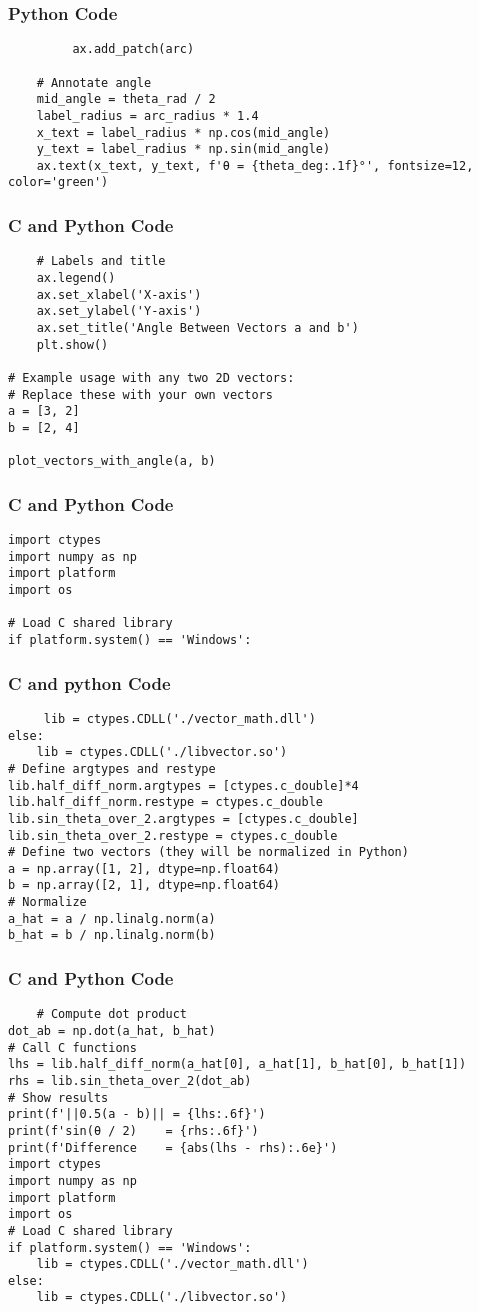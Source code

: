 \documentclass{beamer}
\begin{document}
\begin{frame}[fragile]
\frametitle{Python Code}
    \begin{lstlisting}
         ax.add_patch(arc)

    # Annotate angle
    mid_angle = theta_rad / 2
    label_radius = arc_radius * 1.4
    x_text = label_radius * np.cos(mid_angle)
    y_text = label_radius * np.sin(mid_angle)
    ax.text(x_text, y_text, f'θ = {theta_deg:.1f}°', fontsize=12, color='green')
    \end{lstlisting}
\end{frame}
\begin{frame}[fragile]
\frametitle{C and Python Code}
    \begin{lstlisting}    
    # Labels and title
    ax.legend()
    ax.set_xlabel('X-axis')
    ax.set_ylabel('Y-axis')
    ax.set_title('Angle Between Vectors a and b')
    plt.show()

# Example usage with any two 2D vectors:
# Replace these with your own vectors
a = [3, 2]
b = [2, 4]

plot_vectors_with_angle(a, b)

    \end{lstlisting}
\end{frame}
\begin{frame}[fragile]
\frametitle{C and Python Code}
\begin{lstlisting}
import ctypes
import numpy as np
import platform
import os

# Load C shared library
if platform.system() == 'Windows':

\end{lstlisting} 
\end{frame}
\begin{frame}[fragile]
\frametitle{C and python Code}
\begin{lstlisting}
     lib = ctypes.CDLL('./vector_math.dll')
else:
    lib = ctypes.CDLL('./libvector.so')
# Define argtypes and restype
lib.half_diff_norm.argtypes = [ctypes.c_double]*4
lib.half_diff_norm.restype = ctypes.c_double
lib.sin_theta_over_2.argtypes = [ctypes.c_double]
lib.sin_theta_over_2.restype = ctypes.c_double
# Define two vectors (they will be normalized in Python)
a = np.array([1, 2], dtype=np.float64)
b = np.array([2, 1], dtype=np.float64)
# Normalize
a_hat = a / np.linalg.norm(a)
b_hat = b / np.linalg.norm(b)
\end{lstlisting}
\end{frame}
\begin{frame}[fragile]
\frametitle{C and Python Code}
\begin{lstlisting}
    # Compute dot product
dot_ab = np.dot(a_hat, b_hat)
# Call C functions
lhs = lib.half_diff_norm(a_hat[0], a_hat[1], b_hat[0], b_hat[1])
rhs = lib.sin_theta_over_2(dot_ab)
# Show results
print(f'||0.5(a - b)|| = {lhs:.6f}')
print(f'sin(θ / 2)    = {rhs:.6f}')
print(f'Difference    = {abs(lhs - rhs):.6e}')
import ctypes
import numpy as np
import platform
import os
# Load C shared library
if platform.system() == 'Windows':
    lib = ctypes.CDLL('./vector_math.dll')
else:
    lib = ctypes.CDLL('./libvector.so')
\end{lstlisting}
\end{frame}
\end{document}
